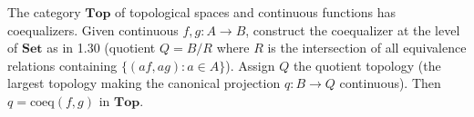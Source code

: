 The category $\mathbf{Top}$ of topological spaces and continuous functions has coequalizers. Given continuous $f, g: A \to B$, construct the coequalizer at the level of $\mathbf{Set}$ as in 1.30 (quotient $Q = B/R$ where $R$ is the intersection of all equivalence relations containing $\{(af, ag) : a \in A\}$). Assign $Q$ the quotient topology (the largest topology making the canonical projection $q: B \to Q$ continuous). Then $q = \text{coeq}(f, g)$ in $\mathbf{Top}$.
